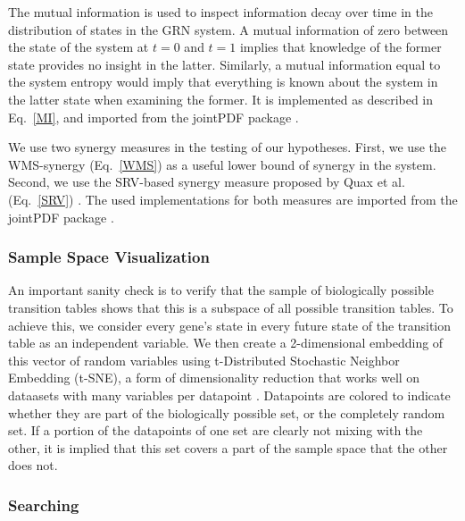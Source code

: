 \documentclass[../main.tex]{subfiles}
\begin{document}
The mutual information is used to inspect information decay over time in the distribution of states in the GRN system.
A mutual information of zero between the state of the system at $t=0$ and $t=1$ implies that knowledge of the former state provides no insight in the latter.
Similarly, a mutual information equal to the system entropy would imply that everything is known about the system in the latter state when examining the former.
It is implemented as described in Eq.~\ref{MI}, and imported from the jointPDF package \cite{jointpdf}.

We use two synergy measures in the testing of our hypotheses.
First, we use the WMS-synergy (Eq.~\ref{WMS}) as a useful lower bound of synergy in the system.
Second, we use the SRV-based synergy measure proposed by Quax et al. (Eq.~\ref{SRV}) \cite{quax2017quantifying}.
The used implementations for both measures are imported from the jointPDF package \cite{jointpdf}.


\subsubsection{Sample Space Visualization}

An important sanity check is to verify that the sample of biologically possible transition tables shows that this is a subspace of all possible transition tables.
To achieve this, we consider every gene's state in every future state of the transition table as an independent variable.
We then create a 2-dimensional embedding of this vector of random variables using t-Distributed Stochastic Neighbor Embedding (t-SNE), a form of dimensionality reduction that works well on dataasets with many variables per datapoint \cite{maaten2008visualizing}.
Datapoints are colored to indicate whether they are part of the biologically possible set, or the completely random set.
If a portion of the datapoints of one set are clearly not mixing with the other, it is implied that this set covers a part of the sample space that the other does not.

\subsubsection{Searching}
\end{document}
